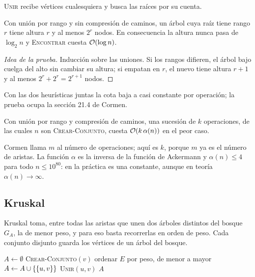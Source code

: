 \documentclass[11pt,letterpaper]{article}
\begin{document}
\textsc{Unir} recibe vértices cualesquiera y busca las raíces por su
cuenta.

\begin{lema}
  \label{lem:rango-conjuntos}
  Con unión por rango y sin compresión de caminos, un árbol cuya raíz
  tiene rango $r$ tiene altura $r$ y al menos $2^r$ nodos. En
  consecuencia la altura nunca pasa de $\log_2 n$ y \textsc{Encontrar}
  cuesta $\mathcal{O}\!\left(\log n\right)$.
\end{lema}

\begin{proof}[Idea de la prueba]
  Inducción sobre las uniones. Si los rangos difieren, el árbol bajo
  cuelga del alto sin cambiar su altura; si empatan en $r$, el nuevo
  tiene altura $r + 1$ y al menos $2^r + 2^r = 2^{r+1}$ nodos.
\end{proof}

Con las dos heurísticas juntas la cota baja a casi constante por
operación; la prueba ocupa la sección 21.4 de Cormen.

\begin{teorema}
  \label{teo:cota-conjuntos}
  Con unión por rango y compresión de caminos, una sucesión de $k$
  operaciones, de las cuales $n$ son \textsc{Crear-Conjunto}, cuesta
  $\mathcal{O}\!\left(k\,\alpha(n)\right)$ en el peor caso.
\end{teorema}

Cormen llama $m$ al número de operaciones; aquí es $k$, porque $m$ ya
es el número de aristas. La función $\alpha$ es la inversa de la
función de Ackermann y $\alpha(n) \le 4$ para todo $n \le 10^{80}$: en
la práctica es una constante, aunque en teoría $\alpha(n) \to \infty$.


\subsection*{Kruskal}

Kruskal toma, entre todas las aristas que unen dos árboles distintos
del bosque $G_A$, la de menor peso, y para eso basta recorrerlas en
orden de peso. Cada conjunto disjunto guarda los vértices de un árbol
del bosque.

\begin{algorithm}[H]
\caption{\textsc{MST-Kruskal}$(G, w)$}
\label{alg:mst-kruskal}
\begin{algorithmic}[1]
  \State $A \gets \emptyset$
    \State \textsc{Crear-Conjunto}$(v)$
  \EndFor
  \State ordenar $E$ por peso, de menor a mayor
      \State $A \gets A \cup \left\{ \left\{ u, v \right\} \right\}$
      \State \textsc{Unir}$(u, v)$
    \EndIf
  \EndFor
  \State \Return $A$
\EndProcedure
\end{algorithmic}
\end{algorithm}
\end{document}
